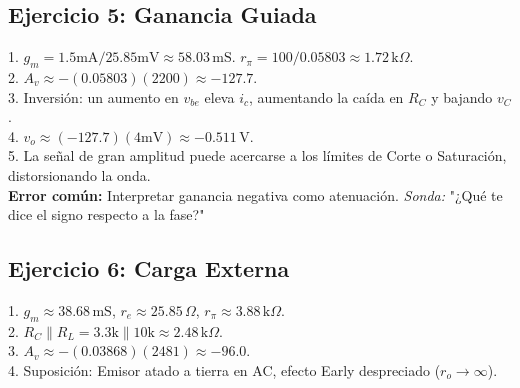 \documentclass[11pt, a4paper]{article}
\begin{document}
\subsection*{Ejercicio 5: Ganancia Guiada}
1. $g_m = 1.5\text{mA} / 25.85\text{mV} \approx 58.03\,\text{mS}$. $r_\pi = 100 / 0.05803 \approx 1.72\,\text{k}\Omega$. \\
2. $A_v \approx -(0.05803)(2200) \approx -127.7$. \\
3. Inversión: un aumento en $v_{be}$ eleva $i_c$, aumentando la caída en $R_C$ y bajando $v_C$. \\
4. $v_o \approx (-127.7)(4\text{mV}) \approx -0.511\,\text{V}$. \\
5. La señal de gran amplitud puede acercarse a los límites de Corte o Saturación, distorsionando la onda. \\
\textbf{Error común:} Interpretar ganancia negativa como atenuación. \textit{Sonda:} "¿Qué te dice el signo respecto a la fase?"

\subsection*{Ejercicio 6: Carga Externa}
1. $g_m \approx 38.68\,\text{mS}$, $r_e \approx 25.85\,\Omega$, $r_\pi \approx 3.88\,\text{k}\Omega$. \\
2. $R_C \parallel R_L = 3.3\text{k} \parallel 10\text{k} \approx 2.48\,\text{k}\Omega$. \\
3. $A_v \approx -(0.03868)(2481) \approx -96.0$. \\
4. Suposición: Emisor atado a tierra en AC, efecto Early despreciado ($r_o \to \infty$).
\end{document}
